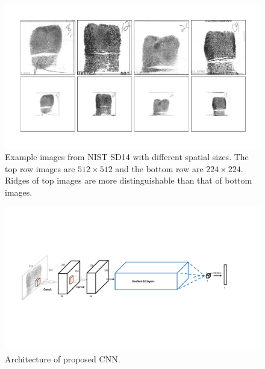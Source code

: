 %
\begin{figure}[!ht]
	\begin{center}
		\includegraphics[scale=0.28,clip=true,trim = 20mm 15mm 10mm 10mm]{fig/figs/resize_examples.pdf}
	\end{center}
	\caption{Example images from NIST SD14 with different spatial sizes. The top row images are $512\times512$ and the bottom row are $224\times224$. Ridges of top images are more distinguishable than that of bottom images. } 
	\label{fig.resize_examples}
\end{figure}
%
%
\begin{figure}[!ht]
	\begin{center}
		\includegraphics[scale=0.65,clip=true,trim = 20mm 65mm 40mm 65mm]{fig/figs/cnn_arch.pdf}
	\end{center}
	\caption{Architecture of proposed CNN.} 
	\label{fig.cnn_arch}
\end{figure}


